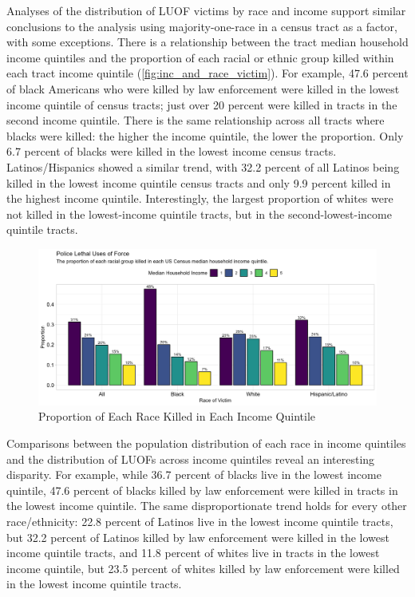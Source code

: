 \documentclass[12pt]{article}
\begin{document}
Analyses of the distribution of LUOF victims by race and income support similar conclusions to the analysis using majority-one-race in a census tract as a factor, with some exceptions. There is a relationship between the tract median household income quintiles and the proportion of each racial or ethnic group killed within each tract income quintile (\autoref{fig:inc_and_race_victim}). For example, 47.6 percent of black Americans who were killed by law enforcement were killed in the lowest income quintile of census tracts; just over 20 percent were killed in tracts in the second income quintile. There is the same relationship across all tracts where blacks were killed: the higher the income quintile, the lower the proportion. Only 6.7 percent of blacks were killed in the lowest income census tracts. Latinos/Hispanics showed a similar trend, with 32.2 percent of all Latinos being killed in the lowest income quintile census tracts and only 9.9 percent killed in the highest income quintile. Interestingly, the largest proportion of whites were not killed in the lowest-income quintile tracts, but in the second-lowest-income quintile tracts.

\begin{figure}[H]
  \centering
  \includegraphics[width=\linewidth]{images/inc_and_race_victim}
  \captionsetup{justification=centering, singlelinecheck=false, margin=2cm}
  \caption{Proportion of Each Race Killed in Each Income Quintile}
  \label{fig:inc_and_race_victim}
\end{figure}


Comparisons between the population distribution of each race in income quintiles and the distribution of LUOFs across income quintiles reveal an interesting disparity. For example, while 36.7 percent of blacks live in the lowest income quintile, 47.6 percent of blacks killed by law enforcement were killed in tracts in the lowest income quintile. The same disproportionate trend holds for every other race/ethnicity: 22.8 percent of Latinos live in the lowest income quintile tracts, but 32.2 percent of Latinos killed by law enforcement were killed in the lowest income quintile tracts, and 11.8 percent of whites live in tracts in the lowest income quintile, but 23.5 percent of whites killed by law enforcement were killed in the lowest income quintile tracts.
\end{document}
